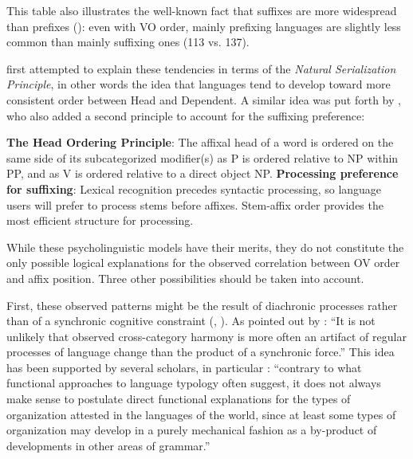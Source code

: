 \documentclass[oldfontcommands,twoside,a4paper,12pt]{article}
\begin{document}
 

This table also illustrates the well-known fact that suffixes are more widespread than prefixes (\citealt[67]{sapir21language}): even with VO order, mainly prefixing languages are   slightly less common than mainly suffixing ones (113 vs. 137).

 \citet{vennemann74analogy}   first attempted to explain these tendencies in terms of the \textit{Natural Serialization Principle}, in other words the idea that languages tend to develop toward more consistent order between Head and Dependent. A similar idea was put forth by \citet[227]{hawkins88prefixing}, who also added a second principle to account for the suffixing preference:
\begin{exe}
\ex \label{ex:hawkins}
\begin{xlist}[(ii)]
\glt \textbf{The Head Ordering Principle}: The affixal head of a word is ordered on the same side of its
subcategorized modifier(s) as P is ordered relative to NP within PP, and as V is ordered relative to a direct object NP.
\glt \textbf{Processing preference for suffixing}:
Lexical recognition precedes syntactic processing, so language users will prefer to process stems before affixes. Stem-affix order provides the most efficient structure for processing.
   \end{xlist}
\end{exe}



While these psycholinguistic models have their merits, they do not constitute the only possible logical explanations for the observed correlation between OV order and affix position. Three other possibilities should be taken into account.

First, these observed patterns might be the result of diachronic processes rather than of a synchronic cognitive constraint (\citealt{bybee88dia}, \citealt{mithun03prefixes}). As pointed out by \citet[178]{mithun03prefixes}: ``It is not unlikely that observed cross-category harmony is more often an artifact of regular processes of language change than the product of a synchronic force.'' This idea has been supported by several scholars, in particular  \citet[2]{creissels08alignment}: ``contrary to what functional approaches to language typology often suggest, it does not always make sense to postulate direct functional explanations for the types of organization attested in the languages of the world, since at least some types of organization may develop in a purely mechanical fashion as a by-product of developments in other areas of grammar.''
\end{document}

